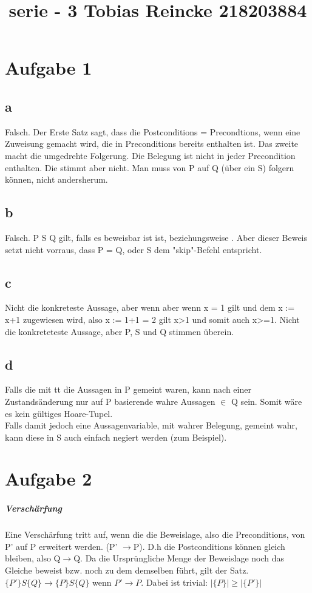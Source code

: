 \documentclass[10pt,a4paper]{article}
\title{serie - 3  Tobias Reincke 218203884}
\begin{document}
\section{Aufgabe 1}
\subsection{a}
Falsch. Der Erste Satz sagt, dass die Postconditions = Precondtions, wenn eine Zuweisung gemacht wird, die in Preconditions bereits enthalten ist.
Das zweite macht die umgedrehte Folgerung. Die Belegung ist nicht in jeder Precondition enthalten.  Die stimmt aber nicht. Man muss von P auf Q (über ein S) folgern können, nicht andersherum.
\subsection{b}
Falsch. P S Q  gilt, falls es beweisbar ist ist, beziehungsweise . Aber dieser Beweis setzt nicht vorraus, dass P = Q, oder S dem "skip"-Befehl entspricht.
\subsection{c}

Nicht die konkreteste Aussage, aber wenn aber wenn x = 1 gilt und dem x := x+1 zugewiesen wird, also x := 1+1 = 2 gilt x>1 und somit auch x>=1. Nicht die konkreteteste Aussage, aber P, S  und Q stimmen überein.
\subsection{d} Falls die mit {tt} die Aussagen in P gemeint waren, kann nach einer Zustandsänderung nur auf P basierende  wahre Aussagen $\in$ Q sein. Somit wäre es kein gültiges Hoare-Tupel. \\
Falls damit jedoch eine Aussagenvariable, mit wahrer Belegung, gemeint wahr, kann diese in S auch einfach negiert werden (zum Beispiel). 
\section{Aufgabe 2}

 \subparagraph{Verschärfung}
 Eine Verschärfung tritt auf, wenn die die Beweislage, also die Preconditions, von P' auf P erweitert werden. (P' $\rightarrow$P). D.h die  Postconditions können gleich bleiben, also Q$\rightarrow$Q. Da die Ursprüngliche Menge der Beweislage noch das Gleiche beweist bzw. noch zu dem demselben führt, gilt der Satz. $\{P'\} S  \{Q\} \rightarrow \{P\} S\{Q\} $ wenn $P'\rightarrow P$. Dabei ist trivial: $|\{P\}|\geq|\{P' \}|$
\end{document}
